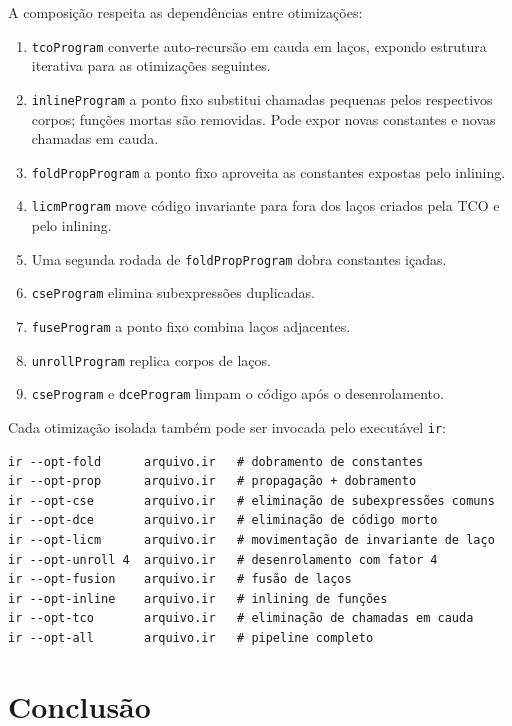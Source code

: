 A composição respeita as dependências entre otimizações:
\begin{enumerate}
  \item \texttt{tcoProgram} converte auto-recursão em cauda em laços, expondo
    estrutura iterativa para as otimizações seguintes.
  \item \texttt{inlineProgram} a ponto fixo substitui chamadas pequenas pelos
    respectivos corpos; funções mortas são removidas.  Pode expor novas
    constantes e novas chamadas em cauda.
  \item \texttt{foldPropProgram} a ponto fixo aproveita as constantes expostas
    pelo inlining.
  \item \texttt{licmProgram} move código invariante para fora dos laços criados
    pela TCO e pelo inlining.
  \item Uma segunda rodada de \texttt{foldPropProgram} dobra constantes
    içadas.
  \item \texttt{cseProgram} elimina subexpressões duplicadas.
  \item \texttt{fuseProgram} a ponto fixo combina laços adjacentes.
  \item \texttt{unrollProgram} replica corpos de laços.
  \item \texttt{cseProgram} e \texttt{dceProgram} limpam o código após o
    desenrolamento.
\end{enumerate}

Cada otimização isolada também pode ser invocada pelo executável \texttt{ir}:

\begin{verbatim}
ir --opt-fold      arquivo.ir   # dobramento de constantes
ir --opt-prop      arquivo.ir   # propagação + dobramento
ir --opt-cse       arquivo.ir   # eliminação de subexpressões comuns
ir --opt-dce       arquivo.ir   # eliminação de código morto
ir --opt-licm      arquivo.ir   # movimentação de invariante de laço
ir --opt-unroll 4  arquivo.ir   # desenrolamento com fator 4
ir --opt-fusion    arquivo.ir   # fusão de laços
ir --opt-inline    arquivo.ir   # inlining de funções
ir --opt-tco       arquivo.ir   # eliminação de chamadas em cauda
ir --opt-all       arquivo.ir   # pipeline completo
\end{verbatim}

\section{Conclusão}\label{sec:opt-conclusao}


